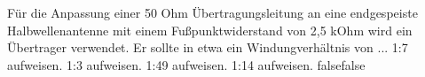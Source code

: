     {Für die Anpassung einer 50 Ohm Übertragungsleitung an eine endgespeiste Halbwellenantenne mit einem Fußpunktwiderstand von 2,5 kOhm wird ein Übertrager verwendet. Er sollte in etwa ein Windungverhältnis von ...}
    {1:7 aufweisen.}
    {1:3 aufweisen.}
    {1:49 aufweisen.}
    {1:14 aufweisen.}
    {false}{false}